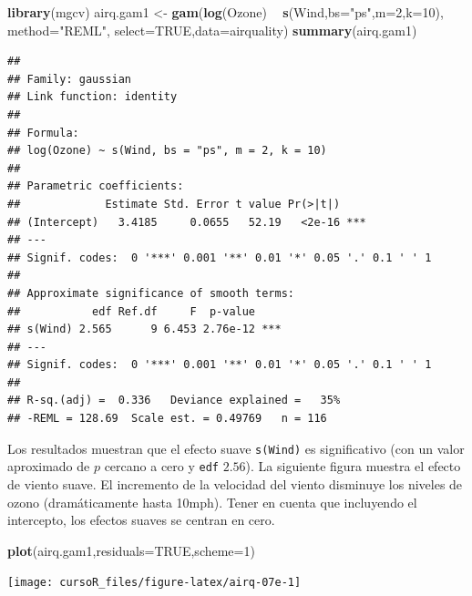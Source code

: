 \documentclass[]{book}
\newenvironment{Shaded}{\begin{snugshade}}{\end{snugshade}}
\newcommand{\KeywordTok}[1]{\textcolor[rgb]{0.13,0.29,0.53}{\textbf{#1}}}
\newcommand{\DataTypeTok}[1]{\textcolor[rgb]{0.13,0.29,0.53}{#1}}
\newcommand{\DecValTok}[1]{\textcolor[rgb]{0.00,0.00,0.81}{#1}}
\newcommand{\StringTok}[1]{\textcolor[rgb]{0.31,0.60,0.02}{#1}}
\newcommand{\OtherTok}[1]{\textcolor[rgb]{0.56,0.35,0.01}{#1}}
\newcommand{\OperatorTok}[1]{\textcolor[rgb]{0.81,0.36,0.00}{\textbf{#1}}}
\newcommand{\NormalTok}[1]{#1}
\begin{document}
\begin{Shaded}
\begin{Highlighting}[]
\KeywordTok{library}\NormalTok{(mgcv)}
\NormalTok{airq.gam1 <-}\StringTok{ }\KeywordTok{gam}\NormalTok{(}\KeywordTok{log}\NormalTok{(Ozone) }\OperatorTok{~}\StringTok{ }\KeywordTok{s}\NormalTok{(Wind,}\DataTypeTok{bs=}\StringTok{"ps"}\NormalTok{,}\DataTypeTok{m=}\DecValTok{2}\NormalTok{,}\DataTypeTok{k=}\DecValTok{10}\NormalTok{),}
                 \DataTypeTok{method=}\StringTok{"REML"}\NormalTok{, }\DataTypeTok{select=}\OtherTok{TRUE}\NormalTok{,}\DataTypeTok{data=}\NormalTok{airquality)}
\KeywordTok{summary}\NormalTok{(airq.gam1)}
\end{Highlighting}
\end{Shaded}

\begin{verbatim}
## 
## Family: gaussian 
## Link function: identity 
## 
## Formula:
## log(Ozone) ~ s(Wind, bs = "ps", m = 2, k = 10)
## 
## Parametric coefficients:
##             Estimate Std. Error t value Pr(>|t|)    
## (Intercept)   3.4185     0.0655   52.19   <2e-16 ***
## ---
## Signif. codes:  0 '***' 0.001 '**' 0.01 '*' 0.05 '.' 0.1 ' ' 1
## 
## Approximate significance of smooth terms:
##           edf Ref.df     F  p-value    
## s(Wind) 2.565      9 6.453 2.76e-12 ***
## ---
## Signif. codes:  0 '***' 0.001 '**' 0.01 '*' 0.05 '.' 0.1 ' ' 1
## 
## R-sq.(adj) =  0.336   Deviance explained =   35%
## -REML = 128.69  Scale est. = 0.49769   n = 116
\end{verbatim}

Los resultados muestran que el efecto suave \texttt{s(Wind)} es
significativo (con un valor aproximado de \(p\) cercano a cero y
\texttt{edf} \(2.56\)). La siguiente figura muestra el efecto de viento
suave. El incremento de la velocidad del viento disminuye los niveles de
ozono (dramáticamente hasta 10mph). Tener en cuenta que incluyendo el
intercepto, los efectos suaves se centran en cero.

\begin{Shaded}
\begin{Highlighting}[]
\KeywordTok{plot}\NormalTok{(airq.gam1,}\DataTypeTok{residuals=}\OtherTok{TRUE}\NormalTok{,}\DataTypeTok{scheme=}\DecValTok{1}\NormalTok{)}
\end{Highlighting}
\end{Shaded}

\begin{center}\texttt{[image: cursoR\_files/figure-latex/airq-07e-1]} \end{center}
\end{document}
